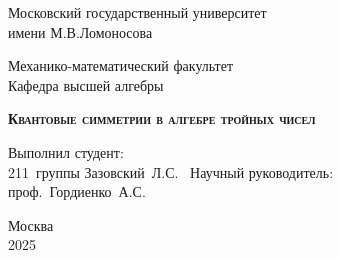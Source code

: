 \documentclass[a4paper, 12pt]{article}
\theoremstyle{definition}
\begin{document}
\fontsize{14pt}{20pt}\selectfont

\begin{titlepage}
\newpage

\begin{center}
Московский государственный университет\\
имени М.В.Ломоносова
\end{center}

\begin{center}
Механико-математический факультет \\
Кафедра высшей алгебры \\ 
\end{center}

\vspace{15em}

\begin{center}
\textsc{\textbf{Квантовые симметрии \linebreak в алгебре тройных чисел}}
\end{center}

\vspace{15em}




\begin{flushright}
\begin{minipage}{.30\textwidth}
Выполнил студент:\\
\vbox{%
    \hfill%
    \vbox{%
        \hbox{211 группы}%
        \hbox{Зазовский Л.С.      }%
    }%
}
Научный руководитель:\\
\vbox{%
    \hfill%
    \vbox{%
        \hbox{проф. Гордиенко А.С.}%
    }%
}
\end{minipage}
\end{flushright}



\vspace{\fill}

\begin{center}
Москва \\2025
\end{center}

\end{titlepage}

    \newpage
    \tableofcontents
    \fontsize{14pt}{20pt}\selectfont
    \newpage
\end{document}
